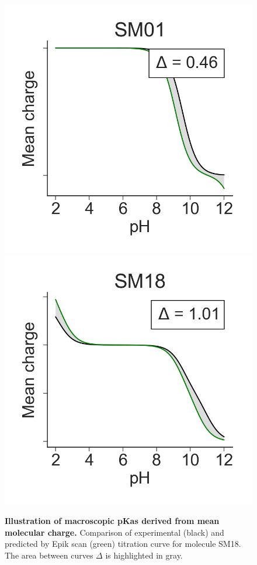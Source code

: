 \documentclass[9pt,lineno]{elife}
\begin{document}
\begin{figure}[H]
    \centering
    \includegraphics[scale=0.45]{Images/Epik/TypeIII/SM01/charge-curve.png}
    \includegraphics[scale=0.45]{Images/Epik/TypeIII/SM18/charge-curve.png}
    \caption{{\bf Illustration of macroscopic pKas derived from mean molecular charge.}
    Comparison of experimental (black) and predicted by Epik scan (green) titration curve for molecule SM18. The area between curves $\Delta$ is highlighted in gray.}
    \label{fig:charge-curves}
\end{figure}
\end{document}
